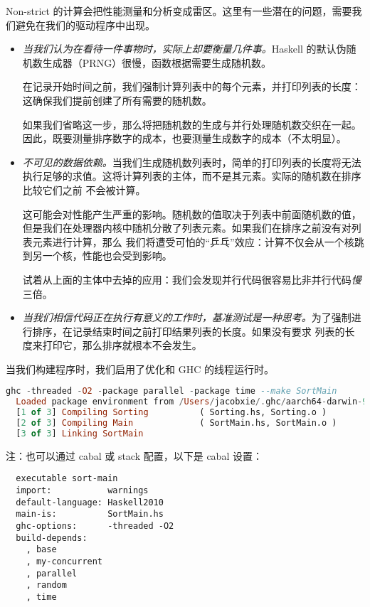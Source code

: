 \documentclass[./main.tex]{subfiles}
\begin{document}
Non-strict 的计算会把性能测量和分析变成雷区。这里有一些潜在的问题，需要我们避免在我们的驱动程序中出现。

\begin{itemize}
  \item \textit{当我们认为在看待一件事物时，实际上却要衡量几件事。}Haskell 的默认伪随机数生成器（PRNG）很慢，函数根据需要生成随机数。

        在记录开始时间之前，我们强制计算列表中的每个元素，并打印列表的长度：这确保我们提前创建了所有需要的随机数。

        如果我们省略这一步，那么将把随机数的生成与并行处理随机数交织在一起。因此，既要测量排序数字的成本，也要测量生成数字的成本（不太明显）。

  \item \textit{不可见的数据依赖。}当我们生成随机数列表时，简单的打印列表的长度将无法执行足够的求值。这将计算列表的主体，而不是其元素。实际的随机数在排序比较它们之前
        不会被计算。

        这可能会对性能产生严重的影响。随机数的值取决于列表中前面随机数的值，但是我们在处理器内核中随机分散了列表元素。如果我们在排序之前没有对列表元素进行计算，那么
        我们将遭受可怕的“乒乓”效应：计算不仅会从一个核跳到另一个核，性能也会受到影响。

        试着从上面的主体中去掉的应用：我们会发现并行代码很容易比非并行代码\textit{慢}三倍。

  \item \textit{当我们相信代码正在执行有意义的工作时，基准测试是一种思考。}为了强制进行排序，在记录结束时间之前打印结果列表的长度。如果没有要求
        列表的长度来打印它，那么排序就根本不会发生。
\end{itemize}

当我们构建程序时，我们启用了优化和 GHC 的线程运行时。

\begin{lstlisting}[language=Haskell]
  ghc -threaded -O2 -package parallel -package time --make SortMain
  Loaded package environment from /Users/jacobxie/.ghc/aarch64-darwin-9.8.2/environments/default
  [1 of 3] Compiling Sorting          ( Sorting.hs, Sorting.o )
  [2 of 3] Compiling Main             ( SortMain.hs, SortMain.o )
  [3 of 3] Linking SortMain
\end{lstlisting}

注：也可以通过 cabal 或 stack 配置，以下是 cabal 设置：

\begin{lstlisting}
  executable sort-main
  import:           warnings
  default-language: Haskell2010
  main-is:          SortMain.hs
  ghc-options:      -threaded -O2
  build-depends:
    , base
    , my-concurrent
    , parallel
    , random
    , time
\end{lstlisting}
\end{document}
